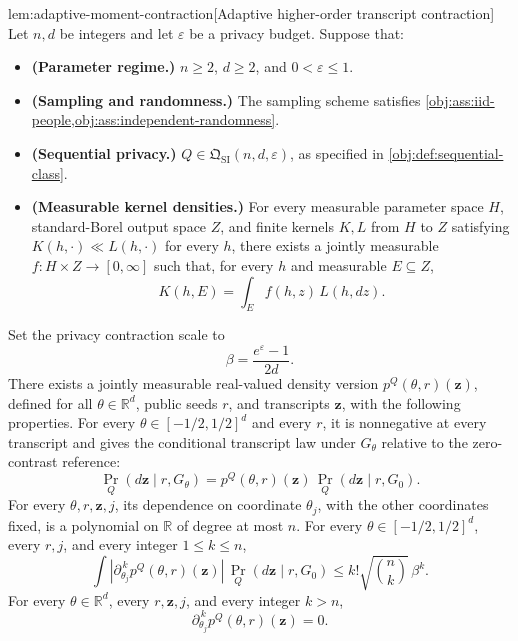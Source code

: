 \begin{lemmav}{lem:adaptive-moment-contraction}[Adaptive higher-order transcript contraction]
Let \(n,d\) be integers and let \(\varepsilon\) be a privacy budget. Suppose that:
\begin{itemize}
\item \textbf{(Parameter regime.)} \(n\ge2\), \(d\ge2\), and \(0<\varepsilon\le1\).
\item \textbf{(Sampling and randomness.)} The sampling scheme satisfies \cref{obj:ass:iid-people,obj:ass:independent-randomness}.
\item \textbf{(Sequential privacy.)} \(Q\in\mathfrak Q_{\mathrm{SI}}(n,d,\varepsilon)\), as specified in \cref{obj:def:sequential-class}.
\item \textbf{(Measurable kernel densities.)} For every measurable parameter space \(H\), standard-Borel output space \(Z\), and finite kernels \(K,L\) from \(H\) to \(Z\) satisfying \(K(h,\cdot)\ll L(h,\cdot)\) for every \(h\), there exists a jointly measurable \(f:H\times Z\to[0,\infty]\) such that, for every \(h\) and measurable \(E\subseteq Z\),
\[
K(h,E)=\int_E f(h,z)\,L(h,dz).
\]
\end{itemize}
Set the privacy contraction scale to
\[
\beta=\frac{e^\varepsilon-1}{2d}.
\]
There exists a jointly measurable real-valued density version \(p^Q(\theta,r)(\mathbf z)\), defined for all \(\theta\in\mathbb R^d\), public seeds \(r\), and transcripts \(\mathbf z\), with the following properties. For every \(\theta\in[-1/2,1/2]^d\) and every \(r\), it is nonnegative at every transcript and gives the conditional transcript law under \(G_\theta\) relative to the zero-contrast reference:
\[
\Pr_Q(d\mathbf z\mid r,G_\theta)
=
p^Q(\theta,r)(\mathbf z)\,
\Pr_Q(d\mathbf z\mid r,G_0).
\]
For every \(\theta,r,\mathbf z,j\), its dependence on coordinate \(\theta_j\), with the other coordinates fixed, is a polynomial on \(\mathbb R\) of degree at most \(n\). For every \(\theta\in[-1/2,1/2]^d\), every \(r,j\), and every integer \(1\le k\le n\),
\[
\int
\left|\partial_{\theta_j}^{\,k}p^Q(\theta,r)(\mathbf z)\right|
\,\Pr_Q(d\mathbf z\mid r,G_0)
\le
k!\sqrt{\binom nk}\,\beta^k.
\]
For every \(\theta\in\mathbb R^d\), every \(r,\mathbf z,j\), and every integer \(k>n\),
\[
\partial_{\theta_j}^{\,k}p^Q(\theta,r)(\mathbf z)=0.
\]


\end{lemmav}
